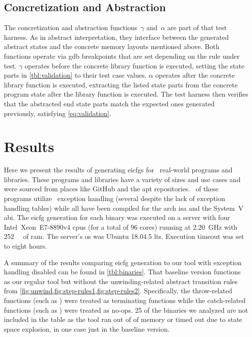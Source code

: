 \subsection{Concretization and Abstraction}
The concretization and abstraction functions~$\gamma$ and~$\alpha$ are part of that test harness.
As in abstract interpretation, they interface between the generated abstract states and the concrete memory layouts mentioned above.
Both functions operate via \ac{gdb} breakpoints that are set depending on the rule under test.
$\gamma$ operates before the concrete library function is executed, setting the state parts in \cref{tbl:validation} to their test case values.
$\alpha$ operates after the concrete library function is executed, extracting the listed state parts from the concrete program state after the library function is executed.
The test harness then verifies that the abstracted end state parts match the expected ones generated previously, satisfying \cref{eq:validation}.

\section{Results}
Here we present the results of generating \acp{eicfg} for \totalbins\ real-world programs and libraries.
These programs and libraries have a variety of sizes and use cases and were sourced from places like GitHub and the \ac{apt} repositories.
\exceptbins\ of these programs utilize \Cpp\ exception handling (several despite the lack of exception handling tables) while all have been compiled for the \gls{arch} \ac{isa} and the System~V \ac{abi}.
The \ac{eicfg} generation for each binary was executed on a server with four Intel\textregistered\ Xeon\textregistered\ E7-8890v4 \acp{cpu} (for a total of 96 cores) running at \SI{2.20}{\giga\hertz} with \SI{252}{\gibi\byte} of \ac{ram}.
The server's \ac{os} was Ubuntu 18.04.5 \ac{lts}.
Execution timeout was set to eight hours. %

A summary of the results comparing \ac{eicfg} generation to our tool with exception handling disabled can be found in \cref{tbl:binaries}.
That baseline version functions as our regular tool but without the unwinding-related abstract transition rules from \cref{fig:unwind,fig:step-rules1,fig:step-rules2}. Specifically, the throw-related functions (such as ) were treated as terminating functions while the catch-related functions (such as ) were treated as no-ops.
25 of the binaries we analyzed are not included in the table as the tool ran out of of memory or timed out due to state space explosion, in one case just in the baseline version.

